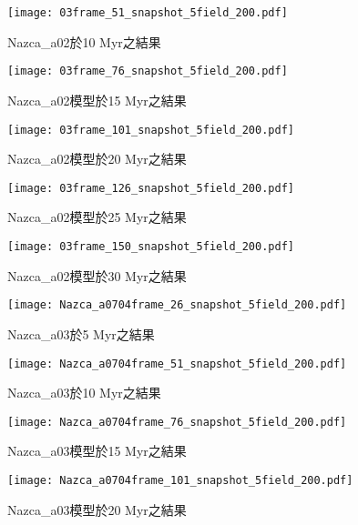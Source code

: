 \begin{figure*}[ht!]
    \centering
    \texttt{[image: 03frame\_51\_snapshot\_5field\_200.pdf]}
    \caption{Nazca\_a02於10 Myr之結果}
\end{figure*}

\begin{figure*}[ht!]
    \centering
    \texttt{[image: 03frame\_76\_snapshot\_5field\_200.pdf]}
    \caption{Nazca\_a02模型於15 Myr之結果}
\end{figure*}

\begin{figure*}[ht!]
    \centering
    \texttt{[image: 03frame\_101\_snapshot\_5field\_200.pdf]}
    \caption{Nazca\_a02模型於20 Myr之結果}
\end{figure*}

\begin{figure*}[ht!]
    \centering
    \texttt{[image: 03frame\_126\_snapshot\_5field\_200.pdf]}
    \caption{Nazca\_a02模型於25 Myr之結果}
\end{figure*}

\begin{figure*}[ht!]
    \centering
    \texttt{[image: 03frame\_150\_snapshot\_5field\_200.pdf]}
    \caption{Nazca\_a02模型於30 Myr之結果}
    \label{fig::Nazca_02_150}
\end{figure*}


\begin{figure*}[ht!]
    \centering
    \texttt{[image: Nazca\_a0704frame\_26\_snapshot\_5field\_200.pdf]}
    \caption{Nazca\_a03於5 Myr之結果}
    \label{fig::Nazca_03_26}
\end{figure*}

\begin{figure*}[ht!]
    \centering
    \texttt{[image: Nazca\_a0704frame\_51\_snapshot\_5field\_200.pdf]}
    \caption{Nazca\_a03於10 Myr之結果}
\end{figure*}

\begin{figure*}[ht!]
    \centering
    \texttt{[image: Nazca\_a0704frame\_76\_snapshot\_5field\_200.pdf]}
    \caption{Nazca\_a03模型於15 Myr之結果}
\end{figure*}

\begin{figure*}[ht!]
    \centering
    \texttt{[image: Nazca\_a0704frame\_101\_snapshot\_5field\_200.pdf]}
    \caption{Nazca\_a03模型於20 Myr之結果}
\end{figure*}

